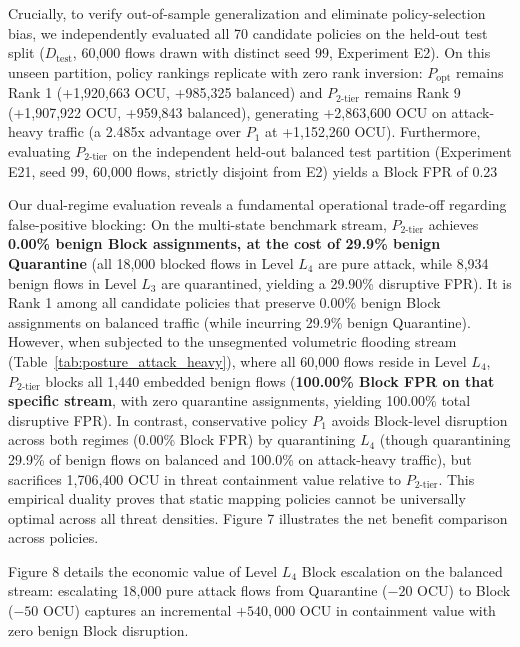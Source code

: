 \documentclass[journal,10pt,onecolumn]{IEEEtran}
\begin{document}
Crucially, to verify out-of-sample generalization and eliminate policy-selection bias, we independently evaluated all 70 candidate policies on the held-out test split ($D_{\text{test}}$, 60,000 flows drawn with distinct seed 99, Experiment E2). On this unseen partition, policy rankings replicate with zero rank inversion: $P_{\text{opt}}$ remains Rank 1 (+1,920,663 OCU, +985,325 balanced) and $P_{2\text{-tier}}$ remains Rank 9 (+1,907,922 OCU, +959,843 balanced), generating +2,863,600 OCU on attack-heavy traffic (a 2.485x advantage over $P_1$ at +1,152,260 OCU). Furthermore, evaluating $P_{2\text{-tier}}$ on the independent held-out balanced test partition (Experiment E21, seed 99, 60,000 flows, strictly disjoint from E2) yields a Block FPR of 0.23%

Our dual-regime evaluation reveals a fundamental operational trade-off regarding false-positive blocking:
On the multi-state benchmark stream, $P_{2\text{-tier}}$ achieves \textbf{0.00\% benign Block assignments, at the cost of 29.9\% benign Quarantine} (all 18,000 blocked flows in Level $L_4$ are pure attack, while 8,934 benign flows in Level $L_3$ are quarantined, yielding a 29.90\% disruptive FPR). It is Rank 1 among all candidate policies that preserve 0.00\% benign Block assignments on balanced traffic (while incurring 29.9\% benign Quarantine). However, when subjected to the unsegmented volumetric flooding stream (Table~\ref{tab:posture_attack_heavy}), where all 60,000 flows reside in Level $L_4$, $P_{2\text{-tier}}$ blocks all 1,440 embedded benign flows (\textbf{100.00\% Block FPR on that specific stream}, with zero quarantine assignments, yielding 100.00\% total disruptive FPR). In contrast, conservative policy $P_1$ avoids Block-level disruption across both regimes (0.00\% Block FPR) by quarantining $L_4$ (though quarantining 29.9\% of benign flows on balanced and 100.0\% on attack-heavy traffic), but sacrifices 1,706,400 OCU in threat containment value relative to $P_{2\text{-tier}}$. This empirical duality proves that static mapping policies cannot be universally optimal across all threat densities. Figure 7 illustrates the net benefit comparison across policies.

Figure 8 details the economic value of Level $L_4$ Block escalation on the balanced stream: escalating 18,000 pure attack flows from Quarantine ($-20$ OCU) to Block ($-50$ OCU) captures an incremental $+540,000$ OCU in containment value with zero benign Block disruption.
\end{document}
